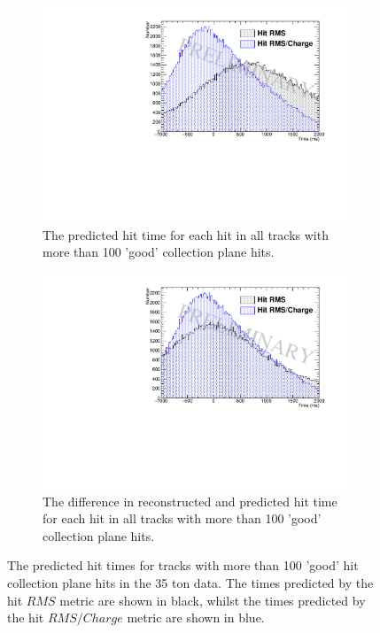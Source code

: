 \begin{figure}[h!]
  \centering
  \begin{subfigure}{0.45\textwidth}
    \centering
    \includegraphics[width=\textwidth]{PredictedInteractionTime_Data}
    \caption{The predicted hit time for each hit in all tracks with more than 100 'good' collection plane hits.}
  \end{subfigure}
  \hspace{0.08\textwidth}
  \begin{subfigure}{0.45\textwidth}
    \centering
    \includegraphics[width=\textwidth]{DifferenceInteractionTime_Data}
    \caption{The difference in reconstructed and predicted hit time for each hit in all tracks with more than 100 'good' collection plane hits.}
  \end{subfigure}
  \caption[The predicted hit times for tracks with more than 100 'good' hit collection plane hits in the 35 ton data]
          {The predicted hit times for tracks with more than 100 'good' hit collection plane hits in the 35 ton data. The times predicted by the hit $RMS$ metric are shown in black, whilst the times predicted by the hit $RMS/Charge$ metric are shown in blue.}
          \label{fig:DiffDataPredHit}
\end{figure}

